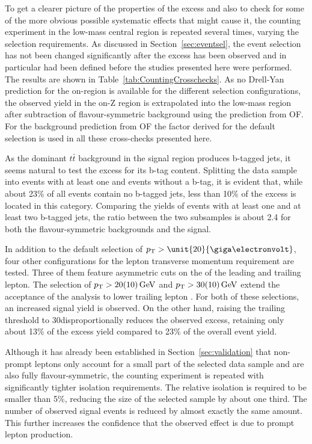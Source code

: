 To get a clearer picture of the properties of the excess and also to check for some of the more obvious possible systematic effects that might cause it, the counting experiment in the low-mass central region is repeated several times, varying the selection requirements. As discussed in Section~\ref{sec:eventsel}, the event selection has not been changed significantly after the excess has been observed and in particular had been defined before the studies presented here were performed. The results are shown in Table~\ref{tab:CountingCrosschecks}. As no Drell-Yan prediction for the on-\Z region is available for the different selection configurations, the observed yield in the on-Z region is extrapolated into the low-mass region after subtraction of flavour-symmetric background using the prediction from OF. For the background prediction from OF the \Rsfof factor derived for the default selection is used in all these cross-checks presented here.

As the dominant $t\bar{t}$ background in the signal region produces b-tagged jets, it seems natural to test the excess for its b-tag content. Splitting the data sample into events with at least one and events without a b-tag, it is evident that, while about 23\% of all events contain no b-tagged jets, less than 10\% of the excess is located in this category. Comparing the yields of events with at least one and at least two b-tagged jets, the ratio between the two subsamples is about 2.4 for both the flavour-symmetric backgrounds and the signal. 

In addition to the default selection of $\pt > \unit{20}{\giga\electronvolt}$, four other configurations for the lepton transverse momentum requirement are tested. Three of them feature asymmetric cuts on the \pt of the leading and trailing lepton. The selection of $p_{\mathrm{T}} > 20(10)\,\mathrm{Ge\hspace{-.08em}V}$ and $ p_{\mathrm{T}} > 30(10)\,\mathrm{Ge\hspace{-.08em}V}$ extend the acceptance of the analysis to lower trailing lepton \pt. For both of these selections, an increased signal yield is observed. On the other hand, raising the trailing \pt threshold to 30\GeV disproportionally reduces the observed excess, retaining only about 13\% of the excess yield compared to 23\% of the overall event yield. 

Although it has already been established in Section~\ref{sec:validation} that non-prompt leptons only account for a small part of the selected data sample and are also fully flavour-symmetric, the counting experiment is repeated with significantly tighter isolation requirements. The relative isolation is required to be smaller than 5\%, reducing the size of the selected sample by about one third. The number of observed signal events is reduced by almost exactly the same amount. This further increases the confidence that the observed effect is due to prompt lepton production.

